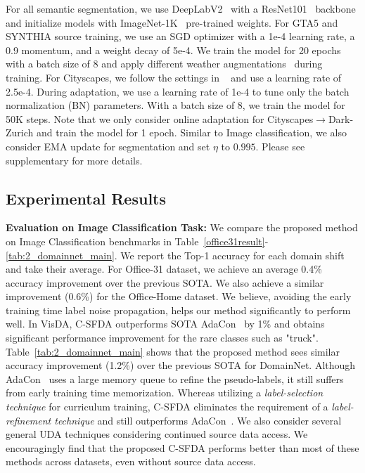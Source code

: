 \documentclass[10pt,twocolumn,letterpaper]{article}
\begin{document}
For all semantic segmentation, we use DeepLabV2~\cite{chen2017deeplab} with a ResNet101~\cite{he2016deep} backbone and initialize models with ImageNet-1K~\cite{deng2009imagenet} pre-trained weights. For GTA5 and SYNTHIA source training, we use an SGD optimizer with a 1e-4 learning rate, a 0.9 momentum, and a weight decay of 5e-4. We train the model for 20 epochs with a batch size of 8 and apply different weather augmentations~\cite{michaelis2019benchmarking} during training. For Cityscapes, we follow the settings in ~\cite{sakaridis2019guided} and use a learning rate of 2.5e-4. During adaptation, we use a learning rate of 1e-4 to tune only the batch normalization (BN) parameters. With a batch size of 8, we train the model for 50K steps. Note that we only consider online adaptation for Cityscapes$\to$Dark-Zurich and train the model for 1 epoch.  Similar to Image classification, we also consider EMA update for segmentation and set $\eta$ to $0.995$. Please see supplementary for more details.       





\vspace{-1mm}
\subsection{Experimental Results}
\vspace{-0.5mm}
\noindent \textbf{Evaluation on Image Classification Task:}
We compare the proposed method on Image Classification benchmarks in Table~\ref{office31result}-\ref{tab:2_domainnet_main}. We report the Top-1 accuracy for each domain shift and take their average. For Office-31 dataset, we achieve an average 0.4\% accuracy improvement over the previous SOTA. We also achieve a similar improvement (0.6\%) for the Office-Home dataset. We believe, avoiding the early training time label noise propagation, helps our method significantly to perform well. In VisDA, C-SFDA outperforms SOTA AdaCon~\cite{chen2022contrastive} by 1\% and obtains significant performance improvement for the rare classes such as "truck". Table~\ref{tab:2_domainnet_main} shows that the proposed method sees similar accuracy improvement (1.2\%) over the previous SOTA for DomainNet. Although AdaCon~\cite{chen2022contrastive} uses a large memory queue to refine the pseudo-labels, it still suffers from early training time memorization. Whereas utilizing a \emph{label-selection technique} for curriculum training, C-SFDA eliminates the requirement of a \emph{label-refinement technique} and still outperforms AdaCon~\cite{chen2022contrastive}. We also consider several general UDA techniques considering continued source data access. We encouragingly find that the proposed C-SFDA performs better than most of these methods across datasets, even without source data access. 
\renewcommand{\arraystretch}{1}
\end{document}

